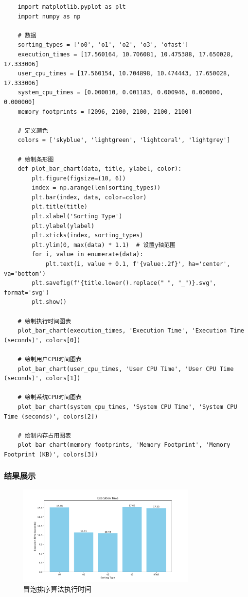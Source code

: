 \documentclass[UTF8]{ctexart}
\begin{document}
\begin{lstlisting}
    import matplotlib.pyplot as plt
    import numpy as np
    
    # 数据
    sorting_types = ['o0', 'o1', 'o2', 'o3', 'ofast']
    execution_times = [17.560164, 10.706081, 10.475388, 17.650028, 17.333006]
    user_cpu_times = [17.560154, 10.704898, 10.474443, 17.650028, 17.333006]
    system_cpu_times = [0.000010, 0.001183, 0.000946, 0.000000, 0.000000]
    memory_footprints = [2096, 2100, 2100, 2100, 2100]
    
    # 定义颜色
    colors = ['skyblue', 'lightgreen', 'lightcoral', 'lightgrey']
    
    # 绘制条形图
    def plot_bar_chart(data, title, ylabel, color):
        plt.figure(figsize=(10, 6))
        index = np.arange(len(sorting_types))
        plt.bar(index, data, color=color)
        plt.title(title)
        plt.xlabel('Sorting Type')
        plt.ylabel(ylabel)
        plt.xticks(index, sorting_types)
        plt.ylim(0, max(data) * 1.1)  # 设置y轴范围
        for i, value in enumerate(data):
            plt.text(i, value + 0.1, f'{value:.2f}', ha='center', va='bottom')
        plt.savefig(f'{title.lower().replace(" ", "_")}.svg', format='svg')
        plt.show()
    
    # 绘制执行时间图表
    plot_bar_chart(execution_times, 'Execution Time', 'Execution Time (seconds)', colors[0])
    
    # 绘制用户CPU时间图表
    plot_bar_chart(user_cpu_times, 'User CPU Time', 'User CPU Time (seconds)', colors[1])
    
    # 绘制系统CPU时间图表
    plot_bar_chart(system_cpu_times, 'System CPU Time', 'System CPU Time (seconds)', colors[2])
    
    # 绘制内存占用图表
    plot_bar_chart(memory_footprints, 'Memory Footprint', 'Memory Footprint (KB)', colors[3])
\end{lstlisting}

\subsubsection{结果展示}
\begin{figure}[H]
    \centering
    \includegraphics[width=0.8\textwidth]{picture/Figure_1.png}
    \caption{冒泡排序算法执行时间}
\end{figure}
\end{document}
